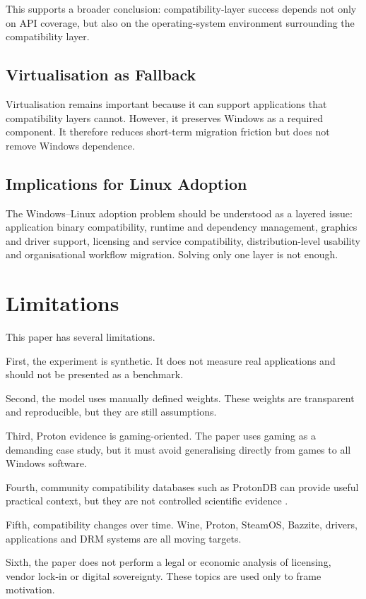 \documentclass[conference]{IEEEtran}
\begin{document}
This supports a broader conclusion: compatibility-layer success depends not only on API coverage, but also on the operating-system environment surrounding the compatibility layer.

\subsection{Virtualisation as Fallback}

Virtualisation remains important because it can support applications that compatibility layers cannot. However, it preserves Windows as a required component. It therefore reduces short-term migration friction but does not remove Windows dependence.

\subsection{Implications for Linux Adoption}

The Windows--Linux adoption problem should be understood as a layered issue: application binary compatibility, runtime and dependency management, graphics and driver support, licensing and service compatibility, distribution-level usability and organisational workflow migration. Solving only one layer is not enough.

\section{Limitations}

This paper has several limitations.

First, the experiment is synthetic. It does not measure real applications and should not be presented as a benchmark.

Second, the model uses manually defined weights. These weights are transparent and reproducible, but they are still assumptions.

Third, Proton evidence is gaming-oriented. The paper uses gaming as a demanding case study, but it must avoid generalising directly from games to all Windows software.

Fourth, community compatibility databases such as ProtonDB can provide useful practical context, but they are not controlled scientific evidence \cite{protondb}.

Fifth, compatibility changes over time. Wine, Proton, SteamOS, Bazzite, drivers, applications and DRM systems are all moving targets.

Sixth, the paper does not perform a legal or economic analysis of licensing, vendor lock-in or digital sovereignty. These topics are used only to frame motivation.
\end{document}
